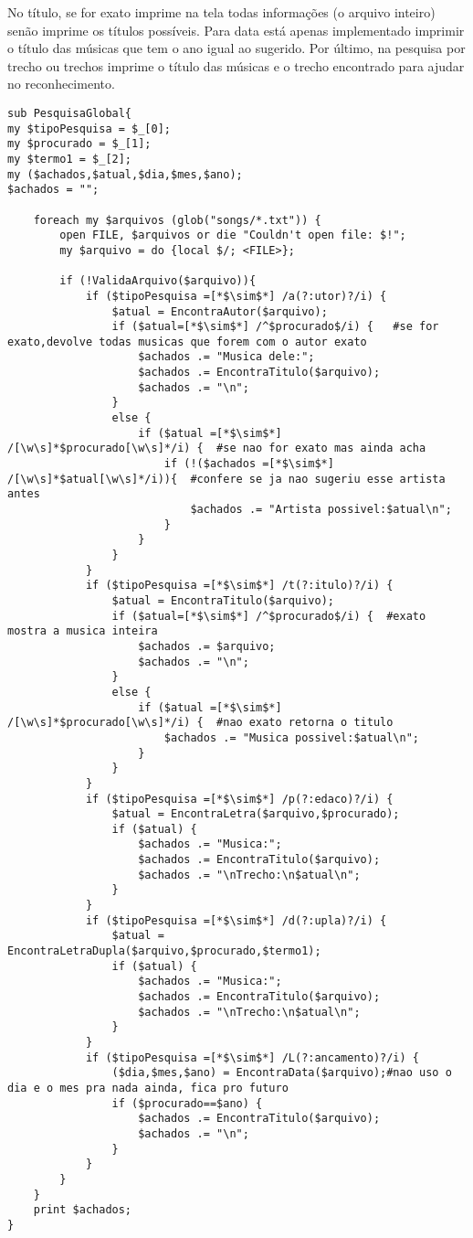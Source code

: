 \documentclass[12pt]{article}
\begin{document}
No título, se for exato imprime na tela todas informações (o arquivo inteiro) senão imprime os títulos possíveis. Para data está apenas implementado imprimir o título das músicas que tem o ano igual ao sugerido. Por último, na pesquisa por trecho ou trechos imprime o título das músicas e o trecho encontrado para ajudar no reconhecimento.
\begin{lstlisting} 
sub PesquisaGlobal{
my $tipoPesquisa = $_[0];
my $procurado = $_[1];
my $termo1 = $_[2];
my ($achados,$atual,$dia,$mes,$ano);
$achados = "";

	foreach my $arquivos (glob("songs/*.txt")) {
		open FILE, $arquivos or die "Couldn't open file: $!";
		my $arquivo = do {local $/; <FILE>};
		
		if (!ValidaArquivo($arquivo)){
			if ($tipoPesquisa =[*$\sim$*] /a(?:utor)?/i) {
				$atual = EncontraAutor($arquivo);        
				if ($atual=[*$\sim$*] /^$procurado$/i) {   #se for exato,devolve todas musicas que forem com o autor exato
					$achados .= "Musica dele:";
					$achados .= EncontraTitulo($arquivo);
					$achados .= "\n";
				}
				else {
					if ($atual =[*$\sim$*] /[\w\s]*$procurado[\w\s]*/i) {  #se nao for exato mas ainda acha
						if (!($achados =[*$\sim$*] /[\w\s]*$atual[\w\s]*/i)){  #confere se ja nao sugeriu esse artista antes
							$achados .= "Artista possivel:$atual\n";
						}
					}
				}
			}
			if ($tipoPesquisa =[*$\sim$*] /t(?:itulo)?/i) {
				$atual = EncontraTitulo($arquivo);
				if ($atual=[*$\sim$*] /^$procurado$/i) {  #exato mostra a musica inteira
					$achados .= $arquivo;
					$achados .= "\n";
				}
				else {
					if ($atual =[*$\sim$*] /[\w\s]*$procurado[\w\s]*/i) {  #nao exato retorna o titulo
						$achados .= "Musica possivel:$atual\n";
					}
				}			
			}
			if ($tipoPesquisa =[*$\sim$*] /p(?:edaco)?/i) {
				$atual = EncontraLetra($arquivo,$procurado);
				if ($atual) {
					$achados .= "Musica:";
					$achados .= EncontraTitulo($arquivo);
					$achados .= "\nTrecho:\n$atual\n";
				}
			}
			if ($tipoPesquisa =[*$\sim$*] /d(?:upla)?/i) {
				$atual = EncontraLetraDupla($arquivo,$procurado,$termo1);
				if ($atual) {
					$achados .= "Musica:";
					$achados .= EncontraTitulo($arquivo);
					$achados .= "\nTrecho:\n$atual\n";
				}			
			}
			if ($tipoPesquisa =[*$\sim$*] /L(?:ancamento)?/i) {
				($dia,$mes,$ano) = EncontraData($arquivo);#nao uso o dia e o mes pra nada ainda, fica pro futuro
				if ($procurado==$ano) {
					$achados .= EncontraTitulo($arquivo);
					$achados .= "\n";
				}			
			}
		}
	}
	print $achados;
}
\end{lstlisting}
\end{document}
